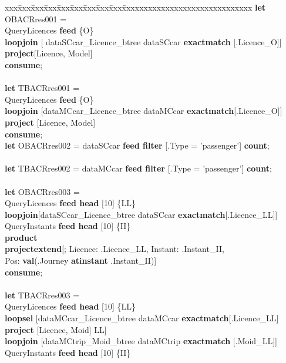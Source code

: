 \documentclass[a4paper]{article}
\newcommand{\op}[1]{\textbf{#1}}
\begin{document}
\begin{scriptsize}
\begin{tabbing}
xxx\=xxx\=xxx\=xxx\=xxx\=xxx\=xxx\=xxx\=xxx\=xxxxxxxxxxxxxxxxxxxxxxxxxxxxxx\kill
\op{let} OBACRres001 = \\
\>QueryLicences \op{feed} \{O\}\\
\>\op{loopjoin} [ dataSCcar\_Licence\_btree dataSCcar \op{exactmatch} [.Licence\_O]]\\
\>\op{project}[Licence, Model]\\
\op{consume};\\
\\
\op{let} TBACRres001 = \\
\>QueryLicences \op{feed} \{O\}\\
\>\op{loopjoin} [dataMCcar\_Licence\_btree dataMCcar \op{exactmatch}[.Licence\_O]]\\
\>\op{project} [Licence, Model]\\
\op{consume};
\\
\op{let} OBACRres002 = dataSCcar \op{feed filter} [.Type = 'passenger'] \op{count};\\
\\
\op{let} TBACRres002 = dataMCcar \op{feed filter} [.Type = 'passenger'] \op{count};\\
\\
\op{let} OBACRres003 =\\
\>QueryLicences \op{feed head} [10] \{LL\}\\
\>\>\op{loopjoin}[dataSCcar\_Licence\_btree dataSCcar \op{exactmatch}[.Licence\_LL]]\\
\>QueryInstants \op{feed head} [10] \{II\}\\
\>\op{product}\\
\>\op{projectextend}[; Licence: .Licence\_LL, Instant: .Instant\_II,\\
\>\>\>\> Pos: \op{val}(.Journey \op{atinstant} .Instant\_II)]\\
\op{consume};\\
\\
\op{let} TBACRres003 =\\
\>QueryLicences \op{feed head} [10] \{LL\}\\
\>\>\op{loopsel} [dataMCcar\_Licence\_btree dataMCcar \op{exactmatch}[.Licence\_LL]\\
\>\>\>\op{project} [Licence, Moid] {LL}]\\
\>\>\>\op{loopjoin} [dataMCtrip\_Moid\_btree dataMCtrip \op{exactmatch} [.Moid\_LL]]\\
\>QueryInstants \op{feed head} [10] \{II\}\\

\end{tabbing}
\end{scriptsize}
\end{document}
